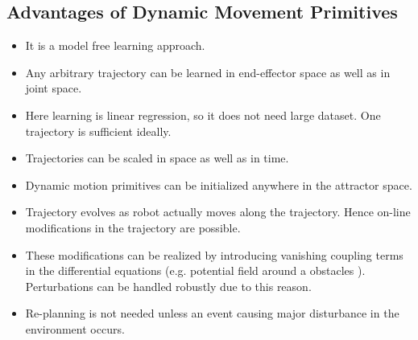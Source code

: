 \subsection{Advantages of Dynamic Movement Primitives}
\begin{itemize}
	\item It is a model free learning approach.
	\item Any arbitrary trajectory can be learned in end-effector space as well as in joint space.
	\item Here learning is linear regression, so it does not need large dataset.
	One trajectory is sufficient ideally.
	\item Trajectories can be scaled in space as well as in time.
	\item Dynamic motion primitives can be initialized anywhere in the attractor space.
	\item Trajectory evolves as robot actually moves along the trajectory. Hence on-line modifications in the trajectory are possible.
	\item These modifications can be realized by introducing vanishing coupling terms in the differential equations (e.g. potential field around a obstacles \cite{park2008movement}). Perturbations can be handled robustly due to this reason.
	\item Re-planning is not needed unless an event causing major disturbance in the environment occurs.
\end{itemize}